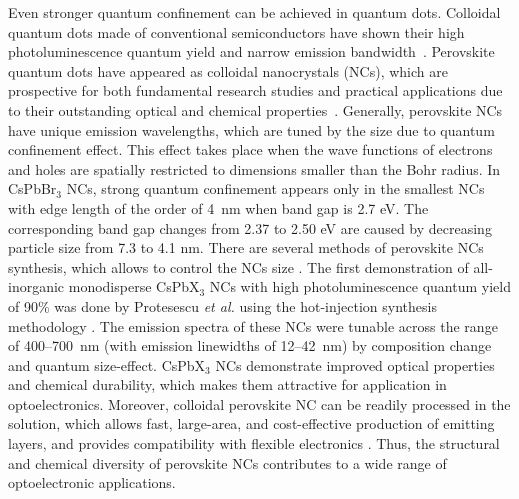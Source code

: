 \documentclass[journal=chreay,manuscript=review]{achemso}
\begin{document}
Even stronger quantum confinement can be achieved in quantum dots. Colloidal quantum dots made of conventional semiconductors have shown their high photoluminescence quantum yield and narrow emission bandwidth~\cite{shirasaki2013emergence}. Perovskite quantum dots have appeared as colloidal nanocrystals (NCs), which are prospective for both fundamental research studies and practical applications due to their outstanding optical and chemical properties~\cite{shamsi2019metal,dey2021state}. Generally, perovskite NCs have unique emission wavelengths, which are tuned by the size due to quantum confinement effect. This effect takes place when the wave functions of electrons and holes are spatially restricted to dimensions smaller than the Bohr radius\cite{sercel2019exciton}. In CsPbBr$_3$ NCs, strong quantum confinement appears only in the smallest NCs with edge length of the order of 4~nm\cite{bucher2019tailoring} when band gap is 2.7 eV. The corresponding band gap changes from 2.37 to 2.50 eV are caused by decreasing particle size from 7.3 to 4.1 nm. There are several methods of perovskite NCs synthesis, which allows to control the NCs size \cite{zhang2015brightly,lignos2016synthesis, hou2017synthesis, protesescu2015nanocrystals}. The first demonstration of all-inorganic monodisperse CsPbX$_3$ NCs with high photoluminescence quantum yield of 90\% was done by Protesescu \textit{et al.} using the hot-injection synthesis methodology \cite{protesescu2015nanocrystals}. The emission spectra of these NCs were tunable across the range of 400–700~nm (with emission linewidths of 12–42~nm) by composition change and quantum size-effect. CsPbX$_3$ NCs demonstrate improved optical properties and  chemical durability, which makes them attractive for application in optoelectronics. Moreover, colloidal perovskite NC can be readily processed in the solution, which allows fast, large-area, and cost-effective production of emitting layers, and provides compatibility with flexible electronics \cite{wang2018perovskite1, zhao2017highly}. Thus, the structural and chemical diversity of perovskite NCs contributes to a wide range of optoelectronic applications\cite{kovalenko2017properties}.

\end{document}

